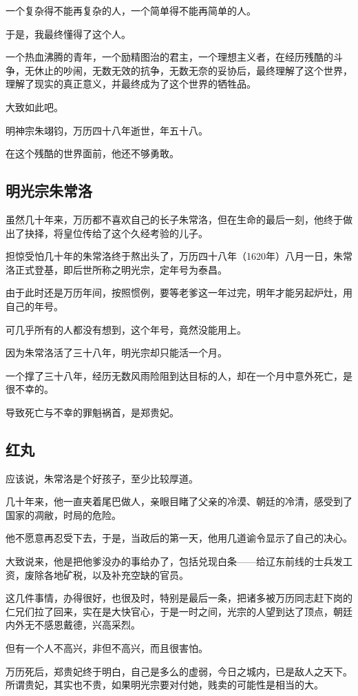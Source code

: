 \begin{multicols}{\theparacolNo}
一个复杂得不能再复杂的人，一个简单得不能再简单的人。

于是，我最终懂得了这个人。

一个热血沸腾的青年，一个励精图治的君主，一个理想主义者，在经历残酷的斗争，无休止的吵闹，无数无效的抗争，无数无奈的妥协后，最终理解了这个世界，理解了现实的真正意义，并最终成为了这个世界的牺牲品。

大致如此吧。

明神宗朱翊钧，万历四十八年逝世，年五十八。

在这个残酷的世界面前，他还不够勇敢。

\subsection{明光宗朱常洛}
虽然几十年来，万历都不喜欢自己的长子朱常洛，但在生命的最后一刻，他终于做出了抉择，将皇位传给了这个久经考验的儿子。

担惊受怕几十年的朱常洛终于熬出头了，万历四十八年（1620年）八月一日，朱常洛正式登基，即后世所称之明光宗，定年号为泰昌。

由于此时还是万历年间，按照惯例，要等老爹这一年过完，明年才能另起炉灶，用自己的年号。

可几乎所有的人都没有想到，这个年号，竟然没能用上。

因为朱常洛活了三十八年，明光宗却只能活一个月。

一个撑了三十八年，经历无数风雨险阻到达目标的人，却在一个月中意外死亡，是很不幸的。

导致死亡与不幸的罪魁祸首，是郑贵妃。

\subsection{红丸}
应该说，朱常洛是个好孩子，至少比较厚道。

几十年来，他一直夹着尾巴做人，亲眼目睹了父亲的冷漠、朝廷的冷清，感受到了国家的凋敝，时局的危险。

他不愿意再忍受下去，于是，当政后的第一天，他用几道谕令显示了自己的决心。

大致说来，他是把他爹没办的事给办了，包括兑现白条——给辽东前线的士兵发工资，废除各地矿税，以及补充空缺的官员。

这几件事情，办得很好，也很及时，特别是最后一条，把诸多被万历同志赶下岗的仁兄们拉了回来，实在是大快官心，于是一时之间，光宗的人望到达了顶点，朝廷内外无不感恩戴德，兴高采烈。

但有一个人不高兴，非但不高兴，而且很害怕。

万历死后，郑贵妃终于明白，自己是多么的虚弱，今日之城内，已是敌人之天下。所谓贵妃，其实也不贵，如果明光宗要对付她，贱卖的可能性是相当的大。


\end{multicols}
